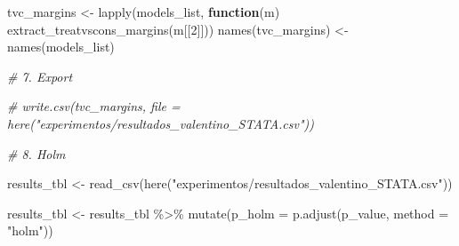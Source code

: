 \documentclass[
  13pt,
  a4paper,
]{article}
\newenvironment{Shaded}{\begin{snugshade}}{\end{snugshade}}
\newcommand{\AttributeTok}[1]{\textcolor[rgb]{0.77,0.63,0.00}{#1}}
\newcommand{\CommentTok}[1]{\textcolor[rgb]{0.56,0.35,0.01}{\textit{#1}}}
\newcommand{\ControlFlowTok}[1]{\textcolor[rgb]{0.13,0.29,0.53}{\textbf{#1}}}
\newcommand{\DecValTok}[1]{\textcolor[rgb]{0.00,0.00,0.81}{#1}}
\newcommand{\FunctionTok}[1]{\textcolor[rgb]{0.00,0.00,0.00}{#1}}
\newcommand{\NormalTok}[1]{#1}
\newcommand{\OtherTok}[1]{\textcolor[rgb]{0.56,0.35,0.01}{#1}}
\newcommand{\SpecialCharTok}[1]{\textcolor[rgb]{0.00,0.00,0.00}{#1}}
\newcommand{\StringTok}[1]{\textcolor[rgb]{0.31,0.60,0.02}{#1}}
\begin{document}
\begin{Shaded}
\begin{Highlighting}[]
\NormalTok{tvc\_margins }\OtherTok{\textless{}{-}} \FunctionTok{lapply}\NormalTok{(models\_list, }\ControlFlowTok{function}\NormalTok{(m) }\FunctionTok{extract\_treatvscons\_margins}\NormalTok{(m[[}\DecValTok{2}\NormalTok{]]))}
\FunctionTok{names}\NormalTok{(tvc\_margins) }\OtherTok{\textless{}{-}} \FunctionTok{names}\NormalTok{(models\_list)}

\CommentTok{\# 7. Export}

\CommentTok{\# write.csv(tvc\_margins, file = here("experimentos/resultados\_valentino\_STATA.csv"))}

\CommentTok{\# 8. Holm}

\NormalTok{results\_tbl }\OtherTok{\textless{}{-}} \FunctionTok{read\_csv}\NormalTok{(}\FunctionTok{here}\NormalTok{(}\StringTok{"experimentos/resultados\_valentino\_STATA.csv"}\NormalTok{))}

\NormalTok{results\_tbl }\OtherTok{\textless{}{-}}\NormalTok{ results\_tbl }\SpecialCharTok{\%\textgreater{}\%}
  \FunctionTok{mutate}\NormalTok{(}\AttributeTok{p\_holm =} \FunctionTok{p.adjust}\NormalTok{(p\_value, }\AttributeTok{method =} \StringTok{"holm"}\NormalTok{))}



\end{Highlighting}
\end{Shaded}
\end{document}
